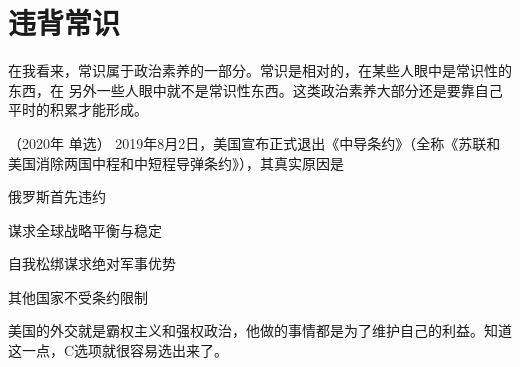 \documentclass[lang=cn,blue,10pt,scheme=chinese,twocol]{zznote}
\begin{document}
\section{违背常识}

\begin{definition}
	在我看来，常识属于政治素养的一部分。常识是相对的，在某些人眼中是常识性的东西，在
	另外一些人眼中就不是常识性东西。这类政治素养大部分还是要靠自己平时的积累才能形成。
\end{definition}


\begin{example}  （2020年 单选）	2019年8月2日，美国宣布正式退出《中导条约》（全称《苏联和美国消除两国中程和中短程导弹条约》），其真实原因是
	\begin{choice}
		\item 俄罗斯首先违约
		\item 谋求全球战略平衡与稳定
		\item 自我松绑谋求绝对军事优势
		\item 其他国家不受条约限制
	\end{choice}

\end{example}
\begin{solution}
	美国的外交就是霸权主义和强权政治，他做的事情都是为了维护自己的利益。知道这一点，C选项就很容易选出来了。
\end{solution}
\end{document}
